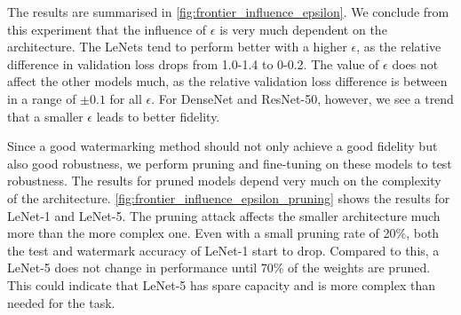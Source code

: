 The results are summarised in \cref{fig:frontier_influence_epsilon}. We conclude from this experiment that the influence of $\epsilon$ is very much dependent on the architecture. The LeNets tend to perform better with a higher $\epsilon$, as the relative difference in validation loss drops from 1.0-1.4 to 0-0.2. The value of $\epsilon$ does not affect the other models much, as the relative validation loss difference is between in a range of $\pm 0.1$ for all $\epsilon$. For DenseNet and ResNet-50, however, we see a trend that a smaller $\epsilon$ leads to better fidelity.

Since a good watermarking method should not only achieve a good fidelity but also good robustness, we perform pruning and fine-tuning on these models to test robustness. The results for pruned models depend very much on the complexity of the architecture. \cref{fig:frontier_influence_epsilon_pruning} shows the results for LeNet-1 and LeNet-5. The pruning attack affects the smaller architecture much more than the more complex one. Even with a small pruning rate of 20\%, both the test and watermark accuracy of LeNet-1 start to drop. Compared to this, a LeNet-5 does not change in performance until 70\% of the weights are pruned. This could indicate that LeNet-5 has spare capacity and is more complex than needed for the task.




